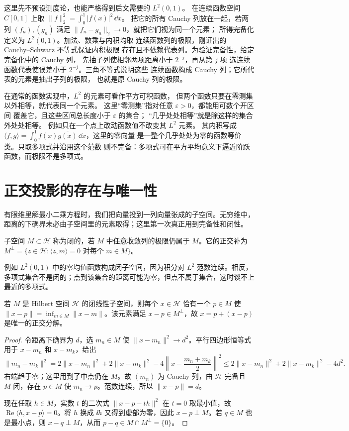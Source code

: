 这里先不预设测度论，也能严格得到后文需要的 \(L^2(0,1)\)。
在连续函数空间 \(C[0,1]\) 上取
\(\|f\|_2^2=\int_0^1|f(x)|^2\,\dd x\)。
把它的所有 Cauchy 列放在一起，若两列 \((f_n),(g_n)\) 满足
\(\|f_n-g_n\|_2\to0\)，就把它们视为同一个元素；
所得完备化定义为 \(L^2(0,1)\)。加法、数乘与内积均取
连续函数列的极限，刚证出的 Cauchy--Schwarz 不等式保证内积极限
存在且不依赖代表列。为验证完备性，给定完备化中的 Cauchy 列，
先抽子列使相邻两项距离小于 \(2^{-j}\)，再从第 \(j\) 项
选连续函数代表使误差小于 \(2^{-j}\)。三角不等式说明这些
连续函数构成 Cauchy 列；它所代表的元素是抽出子列的极限，
也就是原 Cauchy 列的极限。

在通常的函数实现中，\(L^2\) 的元素可看作平方可积函数，
但两个函数只要在零测集以外相等，就代表同一个元素。
这里“零测集”指对任意 \(\varepsilon>0\)，都能用可数个开区间
覆盖它，且这些区间总长度小于 \(\varepsilon\) 的集合；
“几乎处处相等”就是除这样的集合外处处相等。
例如只在一个点上改动函数值不改变其 \(L^2\) 元素。
其内积写成 \(\langle f,g\rangle=
\int_0^1f(x)\overline{g(x)}\,\dd x\)，这里的零向量
是一整个几乎处处为零的函数等价类。只取多项式并沿用这个范数
则不完备：多项式可在平方平均意义下逼近阶跃函数，而极限不是多项式。

\section{正交投影的存在与唯一性}

有限维里解最小二乘方程时，我们把向量投到一列向量张成的子空间。无穷维中，距离的下确界未必由子空间里的元素取得；这里第一次真正用到完备性和闭性。

\begin{definition}[闭子空间与正交补]
子空间 \(M\subset\mathcal H\) 称为闭的，若 \(M\) 中任意收敛列的极限仍属于 \(M\)。它的正交补为 \(M^\perp=\{z\in\mathcal H:\langle z,m\rangle=0\text{ 对每个 }m\in M\}\)。
\end{definition}

例如 \(L^2(0,1)\) 中的零均值函数构成闭子空间，因为积分对 \(L^2\) 范数连续。相反，多项式集合不是闭的；点到该集合的距离可能为零，但点不属于集合，这时谈不上最近的多项式。

\begin{theorem}[闭子空间投影定理]
若 \(M\) 是 Hilbert 空间 \(\mathcal H\) 的闭线性子空间，则每个 \(x\in\mathcal H\) 恰有一个 \(p\in M\) 使 \(\|x-p\|=\inf_{m\in M}\|x-m\|\)。该元素满足 \(x-p\in M^\perp\)，故 \(x=p+(x-p)\) 是唯一的正交分解。
\end{theorem}
\begin{proof}
令距离下确界为 \(d\)，选 \(m_n\in M\) 使 \(\|x-m_n\|^2\to d^2\)。平行四边形恒等式用于 \(x-m_n\) 和 \(x-m_k\)，给出
\[
\|m_n-m_k\|^2
=2\|x-m_n\|^2+2\|x-m_k\|^2
-4\left\|x-\frac{m_n+m_k}{2}\right\|^2
\le 2\|x-m_n\|^2+2\|x-m_k\|^2-4d^2.
\]
右端趋于零；这里用到了中点仍在 \(M\)。故 \((m_n)\) 为 Cauchy 列，由 \(\mathcal H\) 完备且 \(M\) 闭，存在 \(p\in M\) 使 \(m_n\to p\)。范数连续，所以 \(\|x-p\|=d\)。

现在任取 \(h\in M\)，实数 \(t\) 的二次式 \(\|x-p-th\|^2\) 在 \(t=0\) 取最小值，故 \(\operatorname{Re}\langle h,x-p\rangle=0\)。将 \(h\) 换成 \(\ii h\) 又得到虚部为零，因此 \(x-p\perp M\)。若 \(q\in M\) 也是最小点，则 \(x-q\perp M\)，从而 \(p-q\in M\cap M^\perp=\{0\}\)。
\end{proof}

